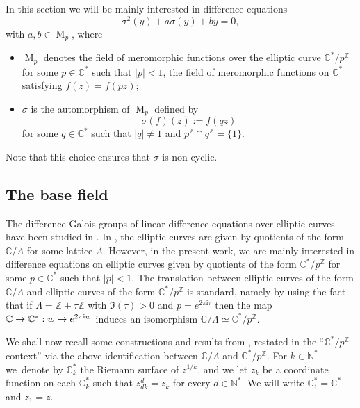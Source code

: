 \documentclass[JEP,XML,SOM,Unicode]{cedram}
\newcommand\mto{\mathchoice{\longmapsto}{\mapsto}{\mapsto}{\mapsto}}
\theoremstyle{definition}
\newcommand{\N}{\mathbb N}
\newcommand{\Z}{\mathbb Z}
\newcommand{\C}{\mathbb C}
\let\s\sigma
\newcommand{\mero}{\operatorname{M}}
\begin{document}
In this section we will be mainly interested in difference equations
\begin{equation}\label{eq:2hypergeo}
\s^{2}(y)+a\s (y)+by=0,
\end{equation}
with $a,b\in \mero_{p}$, where
\begin{itemize}
\item $\mero_{p}$ denotes the field of meromorphic functions over the elliptic curve $\C^{*}/p^{\Z}$ for some $p\in \C^{*}$ such that $\vert p \vert < 1$, \ie the field of meromorphic functions on $\C^{*}$ satisfying $f(z)=f(pz)$;
\item $\s$ is the automorphism of $\mero_{p}$ defined by
\[
\s (f)(z):=f(qz)
\]
for some $q\in \C^{*}$ such that $\vert q \vert \neq 1$ and $p^{\Z} \cap q^{\Z}=\{1\}$.
\end{itemize}
Note that this choice ensures that $\sigma$ is non cyclic.

\subsection{The base field}\label{sec31}

The difference Galois groups of linear difference equations over elliptic curves have been studied in \cite{dreyfus2015galois}. In \loccit, the elliptic curves are given by quotients of the form $\C/\Lambda$ for some lattice $\Lambda$.
However, in the present work, we are mainly interested in difference equations on elliptic curves given by quotients of the form $\C^{*}/p^{\Z}$ for some $p\in \C^{*}$ such that $\vert p \vert < 1$. The translation between elliptic curves of the form $\C/\Lambda$ and elliptic curves of the form $\C^{*}/p^{\Z}$ is standard, namely by using the fact that if $\Lambda=\Z+\tau \Z$ with $\Im(\tau)>0$ and $p = e^{2 \pi \mathrm{i} \tau}$ then the map $\C\to\C^{*}:w\mto e^{2\pi\mathrm{i}w}$ induces an isomorphism $\C/\Lambda\simeq \C^{*}/p^\Z$.

We shall now recall some constructions and results from \cite{dreyfus2015galois}, restated in the ``$\C^{*}/p ^{\Z}$ context'' via the above identification between $\C/\Lambda$ and $\C^{*}/p ^{\Z}$. For $k\in\N^{*}$ we~denote by $\C^{*}_k$ the Riemann surface of $z^{1/k}$, and we let $z_k$ be a coordinate function on each $\C^{*}_k$ such that $z_{dk}^d=z_k$ for every $d\in\N^{*}$. We will write $\C^{*}_1=\C^{*}$ and $z_1=z$.
\end{document}
